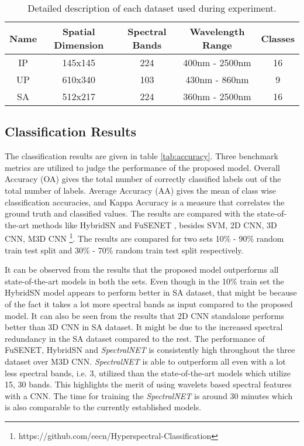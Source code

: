 \documentclass[journal]{IEEEtran}
\begin{document}
\begin{table}[]
    \centering
    \caption{Detailed description of each dataset used during experiment.}
    \begin{tabular}{c c c c c}
         Name & Spatial Dimension & Spectral Bands & Wavelength Range & Classes \\
         \hline
         IP & 145x145 & 224 & 400nm - 2500nm & 16 \\
         UP & 610x340 & 103 & 430nm - 860nm & 9 \\
         SA & 512x217 & 224 & 360nm - 2500nm & 16\\
         \hline
    \end{tabular}
    \label{tab:dataset}
\end{table}
\subsection{Classification Results}
The classification results are given in table \ref{tab:accuracy}. Three benchmark metrics are utilized to judge the performance of the proposed model. Overall Accuracy (OA) gives the total number of correctly classified labels out of the total number of labels. Average Accuracy (AA) gives the mean of class wise classification accuracies, and Kappa Accuracy is a measure that correlates the ground truth and classified values. The results are compared with the state-of-the-art methods like HybridSN \cite{8736016} and FuSENET \cite{iet:/content/journals/10.1049/iet-ipr.2019.1462}, besides SVM, 2D CNN, 3D CNN, M3D CNN \cite{8297014} \footnote{https://github.com/eecn/Hyperspectral-Classification}. The results are compared for two sets 10\% - 90\% random train test split and 30\% - 70\% random train test split respectively.

It can be observed from the results that the proposed model outperforms all state-of-the-art models in both the sets. Even though in the 10\% train set the HybridSN model appears to perform better in SA dataset, that might be because of the fact it takes a lot more spectral bands as input compared to the proposed model. It can also be seen from the results that 2D CNN standalone performs better than 3D CNN in SA dataset. It might be due to the increased spectral redundancy in the SA dataset compared to the rest. The performance of FuSENET, HybridSN and \textit{SpectralNET} is consistently high throughout the three dataset over M3D CNN. \textit{SpectralNET} is able to outperform all even with a lot less spectral bands, i.e. 3, utilized than the state-of-the-art models which utilize 15, 30 bands. This highlights the merit of using wavelets based spectral features with a CNN. The time for training the \textit{SpectralNET} is around 30 minutes which is also comparable to the currently established models. 
\end{document}
